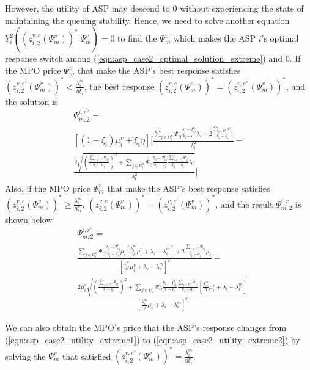 \documentclass[conference]{IEEEtran}
\begin{document}
However, the utility of ASP may descend to $0$ without experiencing the state of maintaining the queuing stability. Hence, we need to solve another equation $Y_i^2((z_{i,2}^{v,e}(\Psi_m^v))^*|\Psi_m^v) = 0$ to find the $\Psi_m^v$ which makes the ASP $i$'s optimal response switch among (\ref{eqn:asp_case2_optimal_solution_extreme}) and $0$.
If the MPO price $\Psi_m^v$ that make the ASP's best response satisfies $(z_{i,2}^{v,e'}(\Psi_m^v))^* < \frac{\lambda_i^m}{\eta\xi_i}$, the best response $(z_{i,2}^{v,e}(\Psi_m^v))^* = (z_{i,2}^{v,e''}(\Psi_m^v))^*$, and the solution is
\begin{multline}
\Psi_{m,2}^{i,r''} = \\
[(1-\xi_i)\mu_i^v + \xi_i \eta]\big[\frac{\sum_{j \in \mathrm{U}_i^n}\Psi_{ij}\frac{b_i-T_{ij}^t }{b_i-a_i}\lambda_i+2\frac{\sum_{j \in \mathrm{U}_i^n}\Psi_{ij}}{b_i-a_i}}{\lambda_i^2}-\\
\frac{2\sqrt{(\frac{\sum_{j \in \mathrm{U}_i^n}\Psi_{ij}}{b_i-a_i})^2+\sum_{j \in \mathrm{U}_i^n}\Psi_{ij}\frac{b_i-T_{ij}^t}{b_i-a_i}\frac{\sum_{j \in \mathrm{U}_i^n}\Psi_{ij}}{b_i-a_i}\lambda_i}}{\lambda_i^2}\big]
\end{multline}
Also, if the MPO price $\Psi_m^v$ that make the ASP's best response satisfies $(z_{i,2}^{v,e}(\Psi_m^v))^* \geq \frac{\lambda_i^m}{\eta\xi_i}$, $(z_{i,2}^{v,e}(\Psi_m^v))^* = (z_{i,2}^{v,e'}(\Psi_m^v))^*$, and the result $\Psi_{m,2}^{i,r}$ is shown below
\begin{equation}
    \begin{aligned}
    &\Psi_{m,2}^{i,r'} = \\ 
&\frac{\sum\limits_{j \in \mathrm{U}_i^n}\Psi_{ij}\frac{b_i-T_{ij}^t }{b_i-a_i}\mu_i[\frac{\lambda_i^m}{\eta}\mu_i^v+\lambda_i-\lambda_i^m]+2\frac{\sum_{j \in \mathrm{U}_i^n}\Psi_{ij}}{b_i-a_i}\mu_i}{[\frac{\lambda_i^m}{\eta}\mu_i^v+\lambda_i-\lambda_i^m]^2}- \\
&\frac{2\mu_i^v\sqrt{(\frac{\sum_{j \in \mathrm{U}_i^n}\Psi_{ij}}{b_i-a_i})^2+\sum\limits_{j \in \mathrm{U}_i^n}\Psi_{ij}\frac{b_i-T_{ij}^t}{b_i-a_i}\frac{\sum_{j \in \mathrm{U}_i^n}\Psi_{ij}}{b_i-a_i}[\frac{\lambda^m_i}{\eta}\mu_i^v+\lambda_i-\lambda_i^m]}}{[\frac{\lambda_i^m}{\eta}\mu_i^v+\lambda_i-\lambda_i^m]^2}
\end{aligned}
\end{equation}



We can also obtain the MPO's price that the ASP's response changes from (\ref{eqn:asp_case2_utility_extreme1}) to (\ref{eqn:asp_case2_utility_extreme2}) by solving the $\Psi^v_m$ that satisfied $(z_{i,2}^{v,e'}(\Psi_m^v))^* = \frac{\lambda_i^m}{\eta \xi_i}$.
\end{document}

